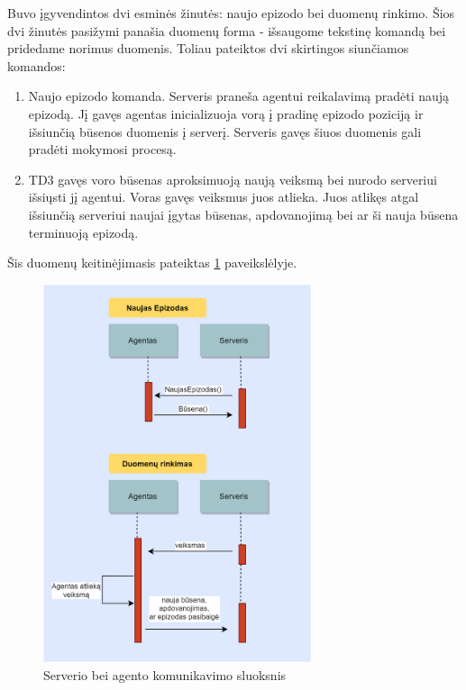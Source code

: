 \documentclass[a4paper, 12pt]{article}
\begin{document}
Buvo įgyvendintos dvi esminės žinutės: naujo epizodo bei duomenų rinkimo. Šios dvi žinutės pasižymi panašia duomenų forma - išsaugome tekstinę komandą bei pridedame norimus duomenis. Toliau pateiktos dvi skirtingos siunčiamos komandos:

\begin{enumerate}
  \addtolength{\itemsep}{-0.5\baselineskip} 
  \item Naujo epizodo komanda. Serveris praneša agentui reikalavimą pradėti naują epizodą. Jį gavęs agentas inicializuoja vorą į pradinę epizodo poziciją ir išsiunčią būsenos duomenis į serverį. Serveris gavęs šiuos duomenis gali pradėti mokymosi procesą.
  \item TD3 gavęs voro būsenas aproksimuoją naują veiksmą bei nurodo serveriui išsiųsti jį agentui. Voras gavęs veiksmus juos atlieka. Juos atlikęs atgal išsiunčią serveriui naujai įgytas būsenas, apdovanojimą bei ar ši nauja būsena terminuoją epizodą.
\end{enumerate}

Šis duomenų keitinėjimasis pateiktas \ref{Reset} paveikslėlyje.

\begin{figure}[h]
\centering
\includegraphics[width=0.7\textwidth]{Reset}
\caption{Serverio bei agento komunikavimo sluoksnis}
\label{Reset}
\end{figure}
\end{document}
